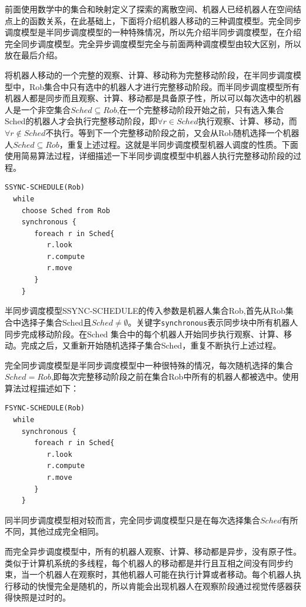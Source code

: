 前面使用数学中的集合和映射定义了探索的离散空间、机器人已经机器人在空间结点上的函数关系，在此基础上，下面将介绍机器人移动的三种调度模型。完全同步调度模型是半同步调度模型的一种特殊情况，所以先介绍半同步调度模型，在介绍完全同步调度模型。完全异步调度模型完全与前面两种调度模型由较大区别，所以放在最后介绍。

将机器人移动的一个完整的观察、计算、移动称为完整移动阶段，在半同步调度模型中，Rob集合中只有选中的机器人才进行完整移动阶段。而半同步调度模型所有机器人都是同步而且观察、计算、移动都是具备原子性，所以可以每次选中的机器人是一个非空集合$Sched  \subseteq Rob $,在一个完整移动阶段开始之前，只有选入集合Sched的机器人才会执行完整移动阶段，即$\forall r \in Sched$执行观察、计算、移动，而$\forall r \notin Sched  $不执行。等到下一个完整移动阶段之前，又会从Rob随机选择一个机器人$Sched  \subseteq Rob $，重复上述过程。这就是半同步调度模型机器人调度的性质。下面使用简易算法过程，详细描述一下半同步调度模型中机器人执行完整移动阶段的过程。

\begin{lstlisting}
SSYNC-SCHEDULE(Rob)
  while
    choose Sched from Rob
    synchronous {
       foreach r in Sched{
          r.look
          r.compute
          r.move
       }
    }
\end{lstlisting}

半同步调度模型SSYNC-SCHEDULE的传入参数是机器人集合Rob,首先从Rob集合中选择子集合Sched且$Sched \neq \emptyset$。关键字\verb|synchronous|表示同步块中所有机器人同步完成移动阶段。在Sched 集合中的每个机器人开始同步执行观察、计算、移动。完成之后，又重新开始随机选择子集合Sched，重复不断执行上述过程。

完全同步调度模型是半同步调度模型中一种很特殊的情况，每次随机选择的集合$Sched = Rob $,即每次完整移动阶段之前在集合Rob中所有的机器人都被选中。使用算法过程描述如下：

\begin{lstlisting}
FSYNC-SCHEDULE(Rob)
  while
    synchronous {
       foreach r in Sched{
          r.look
          r.compute
          r.move
       }
    }
\end{lstlisting}

同半同步调度模型相对较而言，完全同步调度模型只是在每次选择集合$Sched$有所不同，其他过成完全相同。

而完全异步调度模型中，所有的机器人观察、计算、移动都是异步，没有原子性。类似于计算机系统的多线程，每个机器人的移动都是并行且互相之间没有同步约束，当一个机器人在观察时，其他机器人可能在执行计算或者移动。每个机器人执行移动的快慢完全是随机的，所以肯能会出现机器人在观察阶段通过视觉传感器获得快照是过时的。

